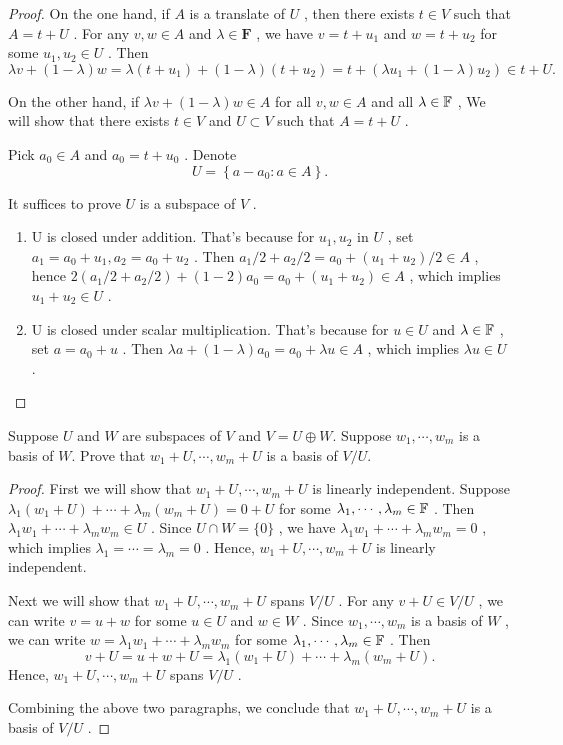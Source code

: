 \documentclass{article}
\begin{document}
\begin{proof}
	On the one hand, if \( A \) is a translate of \( U \) , then there exists \( t \in V \) such that \( A = t + U \) . For any \( v, w \in A \) and \( \lambda \in \mathbf{F} \) , we have \( v = t + u_1 \) and \( w = t + u_2 \) for some \( u_1, u_2 \in U \) . Then
	\[ \lambda v+ (1-\lambda)w= \lambda(t+u_1)+(1-\lambda)(t+u_2)=t+(\lambda u_1+ (1-\lambda) u_2)\in t+U. \] \par
	On the other hand, if \( \lambda v + (1 - \lambda)w \in A \) for all \( v, w \in A \) and all \( \lambda \in \mathbb{F} \) , We will show that there exists  \( t\in V \) and \( U\subset V \) such that \( A=t+U \) . \par
	Pick \( a_0\in A \) and  \( a_0=t+u_0 \) . Denote
	\[ U=\left\{a-a_0:a\in A\right\}. \] \par
	It suffices to prove \( U \) is a subspace of \( V \) . 
	\begin{enumerate}[label=(\alph*)]
		\item U is closed under addition. That's because for \( u_1,u_2 \) in \( U \) , set \( a_1=a_0+u_1, a_2=a_0+u_2 \) . Then \( a_1/2+a_2/2=a_0+(u_1+u_2)/2\in A \) , hence \( 2(a_1/2+a_2/2)+(1-2)a_0=a_0+(u_1+u_2)\in A \) , which implies \( u_1+u_2\in U \) . 
		\item U is closed under scalar multiplication. That's because for \( u\in U \) and \( \lambda\in\mathbb{F} \) , set \( a=a_0+u \) . Then \( \lambda a+(1-\lambda)a_0=a_0+\lambda u\in A \) , which implies \( \lambda u\in U \) .
	\end{enumerate}
\end{proof}

\begin{problem}[3E-14]
	Suppose $U$ and $W$ are subspaces of $V$ and $V = U \oplus W$. Suppose
	$w_1, \cdots, w_m$ is a basis of $W$. Prove that
	$w_1 + U, \cdots, w_m + U$ is a basis of $V/U$.
\end{problem}

\begin{proof}
	First we will show that \( w_1+U, \cdots, w_m+U \) is linearly independent. Suppose \( \lambda_1(w_1+U)+\cdots+\lambda_m(w_m+U)=0+U \) for some \( \lambda_1,\cdots,\lambda_m\in\mathbb{F} \) . Then \( \lambda_1w_1+\cdots+\lambda_mw_m\in U \) . Since \( U\cap W=\{0\} \) , we have \( \lambda_1w_1+\cdots+\lambda_mw_m=0 \) , which implies \( \lambda_1=\cdots=\lambda_m=0 \) . Hence, \( w_1+U, \cdots, w_m+U \) is linearly independent.\par
	Next we will show that \( w_1+U, \cdots, w_m+U \) spans \( V/U \) . For any \( v+U\in V/U \) , we can write \( v=u+w \) for some \( u\in U \) and \( w\in W \) . Since \( w_1, \cdots, w_m \) is a basis of \( W \) , we can write \( w=\lambda_1w_1+\cdots+\lambda_mw_m \) for some \( \lambda_1,\cdots,\lambda_m\in\mathbb{F} \) . Then
	\[ v+U=u+w+U=\lambda_1(w_1+U)+\cdots+\lambda_m(w_m+U). \]
	Hence, \( w_1+U, \cdots, w_m+U \) spans \( V/U \) .\par
	Combining the above two paragraphs, we conclude that \( w_1+U, \cdots, w_m+U \) is a basis of \( V/U \) .
\end{proof}
\end{document}
